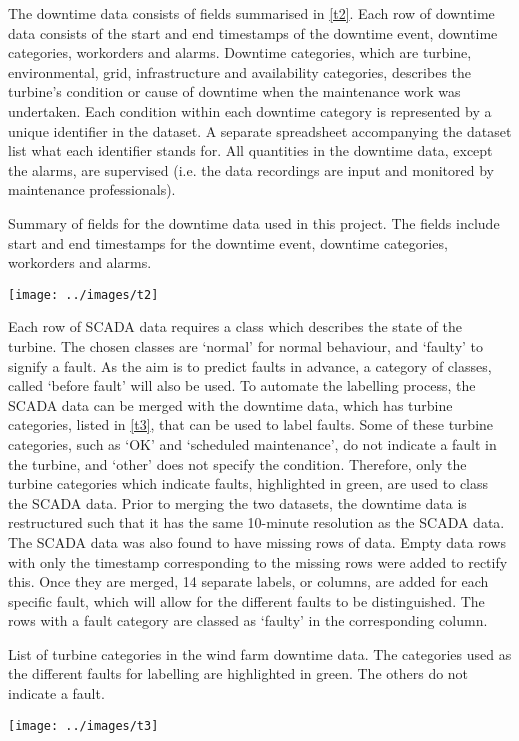 The downtime data consists of fields summarised in \autoref{t2}. Each row of downtime data consists of the start and end timestamps of the downtime event, downtime categories, workorders and alarms. Downtime categories, which are turbine, environmental, grid, infrastructure and availability categories, describes the turbine's condition or cause of downtime when the maintenance work was undertaken. Each condition within each downtime category is represented by a unique identifier in the dataset. A separate spreadsheet accompanying the dataset list what each identifier stands for. All quantities in the downtime data, except the alarms, are supervised (i.e. the data recordings are input and monitored by maintenance professionals).

\begin{table}
  \centering
  \caption{\label{t2}Summary of fields for the downtime data used in this project. The fields include start and end timestamps for the downtime event, downtime categories, workorders and alarms.}
  \texttt{[image: ../images/t2]}
\end{table}

Each row of SCADA data requires a class which describes the state of the turbine. The chosen classes are `normal' for normal behaviour, and `faulty' to signify a fault. As the aim is to predict faults in advance, a category of classes, called `before fault' will also be used. To automate the labelling process, the SCADA data can be merged with the downtime data, which has turbine categories, listed in \autoref{t3}, that can be used to label faults. Some of these turbine categories, such as `OK' and `scheduled maintenance', do not indicate a fault in the turbine, and `other' does not specify the condition. Therefore, only the turbine categories which indicate faults, highlighted in green, are used to class the SCADA data. Prior to merging the two datasets, the downtime data is restructured such that it has the same 10-minute resolution as the SCADA data. The SCADA data was also found to have missing rows of data. Empty data rows with only the timestamp corresponding to the missing rows were added to rectify this. Once they are merged, 14 separate labels, or columns, are added for each specific fault, which will allow for the different faults to be distinguished. The rows with a fault category are classed as `faulty' in the corresponding column.

\begin{table}
  \centering
  \caption{\label{t3}List of turbine categories in the wind farm downtime data. The categories used as the different faults for labelling are highlighted in green. The others do not indicate a fault.}
  \texttt{[image: ../images/t3]}
\end{table}

